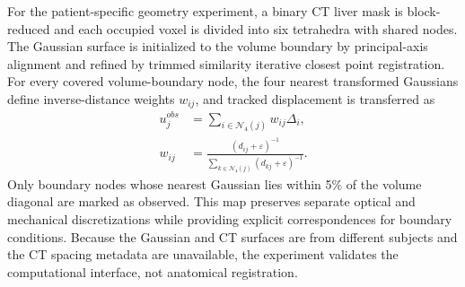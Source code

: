 \documentclass[smallextended]{svjour3}
\begin{document}
For the patient-specific geometry experiment, a binary CT liver mask is
block-reduced and each occupied voxel is divided into six tetrahedra with
shared nodes. The Gaussian surface is initialized to the volume boundary
by principal-axis alignment and refined by trimmed similarity iterative
closest point registration. For every covered volume-boundary node, the
four nearest transformed Gaussians define inverse-distance weights
$w_{ij}$, and tracked displacement is transferred as
\begin{equation}
\begin{aligned}
u_j^{obs} &= \sum_{i\in\mathcal{N}_4(j)} w_{ij}\Delta_i,\\
w_{ij} &=
\frac{(d_{ij}+\varepsilon)^{-1}}
{\sum_{k\in\mathcal{N}_4(j)}(d_{kj}+\varepsilon)^{-1}} .
\end{aligned}
\label{eq:surface_volume_map}
\end{equation}
Only boundary nodes whose nearest Gaussian lies within 5\% of the volume
diagonal are marked as observed. This map preserves separate optical and
mechanical discretizations while providing explicit correspondences for
boundary conditions. Because the Gaussian and CT surfaces are from
different subjects and the CT spacing metadata are unavailable, the
experiment validates the computational interface, not anatomical
registration.
\end{document}
